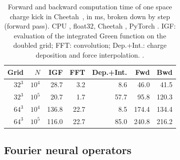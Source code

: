 \begin{table}[t]
  \centering
  \caption{Forward and backward computation time of one space charge kick
  in Cheetah~\cite{kaiser2024cheetah,dhamrait2026memory}, in ms, broken
  down by step (forward pass). CPU , float32,
  Cheetah , PyTorch . IGF: evaluation of the integrated
  Green function on the doubled grid; FFT: convolution; Dep.+Int.: charge
  deposition and force interpolation. .}
  \label{tab:profile}
  \small
  \setlength{\tabcolsep}{4pt}
  \begin{tabular}{rrrrrrr}
    \hline
    Grid & $N$ & IGF & FFT & Dep.+Int. & Fwd & Bwd \\
    \hline
    $32^3$ & $10^4$ &  28.7 &  3.2 &  8.6 &  46.0 &  41.5 \\
    $32^3$ & $10^5$ &  20.7 &  1.7 & 57.7 &  95.8 & 120.3 \\
    $64^3$ & $10^4$ & 136.8 & 22.7 &  8.5 & 174.4 & 134.4 \\
    $64^3$ & $10^5$ & 116.0 & 22.7 & 85.0 & 240.8 & 216.2 \\
    \hline
  \end{tabular}
\end{table}


\subsection{Fourier neural operators}
\label{sec:intro-fno}

